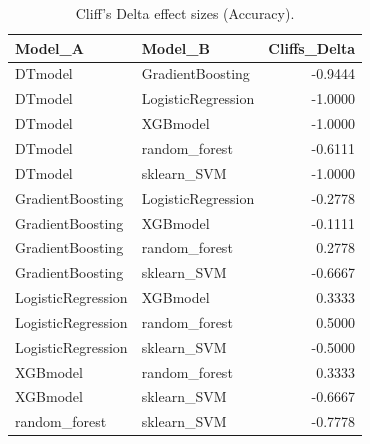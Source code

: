 \begin{table}[t]
\centering
\begin{tabular}{llr}
\toprule
Model_A & Model_B & Cliffs_Delta \\
\midrule
DTmodel & GradientBoosting & -0.9444 \\
DTmodel & LogisticRegression & -1.0000 \\
DTmodel & XGBmodel & -1.0000 \\
DTmodel & random_forest & -0.6111 \\
DTmodel & sklearn_SVM & -1.0000 \\
GradientBoosting & LogisticRegression & -0.2778 \\
GradientBoosting & XGBmodel & -0.1111 \\
GradientBoosting & random_forest & 0.2778 \\
GradientBoosting & sklearn_SVM & -0.6667 \\
LogisticRegression & XGBmodel & 0.3333 \\
LogisticRegression & random_forest & 0.5000 \\
LogisticRegression & sklearn_SVM & -0.5000 \\
XGBmodel & random_forest & 0.3333 \\
XGBmodel & sklearn_SVM & -0.6667 \\
random_forest & sklearn_SVM & -0.7778 \\
\bottomrule
\end{tabular}
\caption{Cliff's Delta effect sizes (Accuracy).}
\label{tab:cliffs_Accuracy}
\end{table}